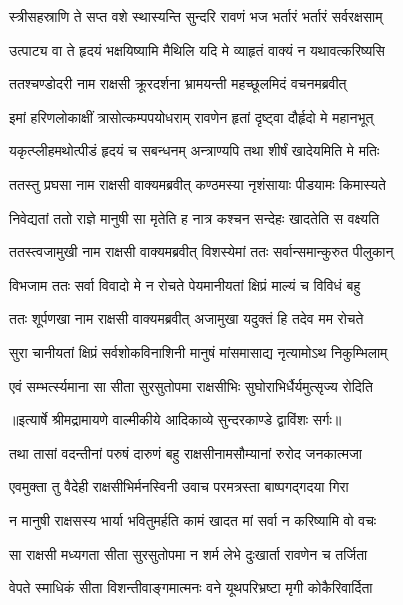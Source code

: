 \twolineshloka
{स्त्रीसहस्राणि ते सप्त वशे स्थास्यन्ति सुन्दरि}
{रावणं भज भर्तारं भर्तारं सर्वरक्षसाम्} %

\twolineshloka
{उत्पाट्य वा ते हृदयं भक्षयिष्यामि मैथिलि}
{यदि मे व्याहृतं वाक्यं न यथावत्करिष्यसि} %

\twolineshloka
{ततश्चण्डोदरी नाम राक्षसी क्रूरदर्शना}
{भ्रामयन्ती महच्छूलमिदं वचनमब्रवीत्} %

\twolineshloka
{इमां हरिणलोकाक्षीं त्रासोत्कम्पपयोधराम्}
{रावणेन हृतां दृष्ट्वा दौर्हृदो मे महानभूत्} %

\twolineshloka
{यकृत्प्लीहमथोत्पीडं हृदयं च सबन्धनम्}
{अन्त्राण्यपि तथा शीर्षं खादेयमिति मे मतिः} %

\twolineshloka
{ततस्तु प्रघसा नाम राक्षसी वाक्यमब्रवीत्}
{कण्ठमस्या नृशंसायाः पीडयामः किमास्यते} %

\twolineshloka
{निवेद्यतां ततो राज्ञे मानुषी सा मृतेति ह}
{नात्र कश्चन सन्देहः खादतेति स वक्ष्यति} %

\twolineshloka
{ततस्त्वजामुखी नाम राक्षसी वाक्यमब्रवीत्}
{विशस्येमां ततः सर्वान्समान्कुरुत पीलुकान्} %

\twolineshloka
{विभजाम ततः सर्वा विवादो मे न रोचते}
{पेयमानीयतां क्षिप्रं माल्यं च विविधं बहु} %

\twolineshloka
{ततः शूर्पणखा नाम राक्षसी वाक्यमब्रवीत्}
{अजामुखा यदुक्तं हि तदेव मम रोचते} %

\twolineshloka
{सुरा चानीयतां क्षिप्रं सर्वशोकविनाशिनी}
{मानुषं मांसमासाद्य नृत्यामोऽथ निकुम्भिलाम्} %

\twolineshloka
{एवं सम्भर्त्स्यमाना सा सीता सुरसुतोपमा}
{राक्षसीभिः सुघोराभिर्धैर्यमुत्सृज्य रोदिति} %


{॥इत्यार्षे श्रीमद्रामायणे वाल्मीकीये आदिकाव्ये सुन्दरकाण्डे द्वाविंशः सर्गः॥}


\twolineshloka
{तथा तासां वदन्तीनां परुषं दारुणं बहु}
{राक्षसीनामसौम्यानां रुरोद जनकात्मजा} %

\twolineshloka
{एवमुक्ता तु वैदेही राक्षसीभिर्मनस्विनी}
{उवाच परमत्रस्ता बाष्पगद्गदया गिरा} %

\twolineshloka
{न मानुषी राक्षसस्य भार्या भवितुमर्हति}
{कामं खादत मां सर्वा न करिष्यामि वो वचः} %

\twolineshloka
{सा राक्षसी मध्यगता सीता सुरसुतोपमा}
{न शर्म लेभे दुःखार्ता रावणेन च तर्जिता} %

\twolineshloka
{वेपते स्माधिकं सीता विशन्तीवाङ्गमात्मनः}
{वने यूथपरिभ्रष्टा मृगी कोकैरिवार्दिता} %


